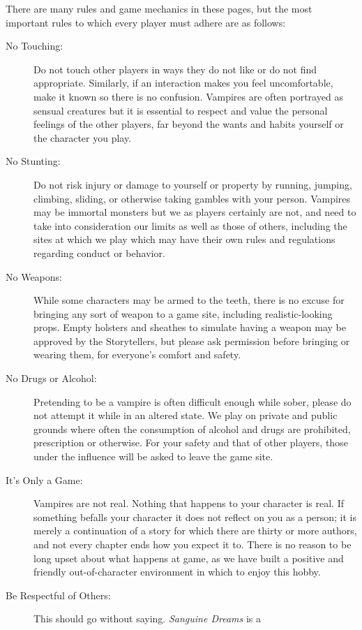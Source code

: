 There are many rules and game mechanics in these pages, but the most important rules to 
which every player must adhere are as follows:

\begin{description}
	\item[No Touching:] Do not touch other players in ways they do not like or do not find 
	appropriate.  Similarly, if an interaction makes you feel uncomfortable, make it known 
	so there is no confusion.  Vampires are often portrayed as sensual creatures but it is 
	essential to respect and value the personal feelings of the other players, far beyond 
	the wants and habits yourself or the character you play.
	\item[No Stunting:] Do not risk injury or damage to yourself or property by 
	running, jumping, climbing, sliding, or otherwise taking gambles with your person.  Vampires 
	may be immortal monsters but we as players certainly are not, and need to take into consideration 
	our limits as well as those of others, including the sites at which we play which may have their 
	own rules and regulations regarding conduct or behavior.
	\item[No Weapons:] While some characters may be armed to the teeth, there is no excuse for 
	bringing any sort of weapon to a game site, including realistic-looking props.  Empty holsters and 
	sheathes to simulate having a weapon may be approved by the Storytellers, but please ask permission 
	before bringing or wearing them, for everyone's comfort and safety.
	\item[No Drugs or Alcohol:] Pretending to be a vampire is often difficult enough while sober, 
	please do not attempt it while in an altered state.  We play on private and public grounds 
	where often the consumption of alcohol and drugs are prohibited, prescription or otherwise.  
	For your safety and that of other players, those under the influence will be asked to leave the 
	game site.
	\item[It's Only a Game:] Vampires are not real.  Nothing that happens to your character is 
	real.  If something befalls your character it does not reflect on you as a person; it is merely 
	a continuation of a story for which there are thirty or more authors, and not every chapter 
	ends how you expect it to.  There is no reason to be long upset about what happens at game, as 
	we have built a positive and friendly out-of-character environment in which to enjoy this hobby.
	\item[Be Respectful of Others:] This should go without saying.  \emph{Sanguine Dreams} is a 

\end{description}
